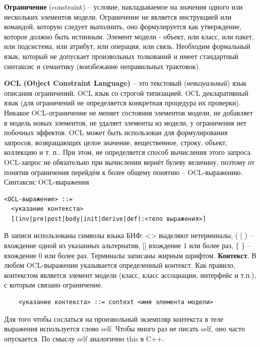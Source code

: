
\textbf{Ограничение} (constraint) – условие, накладываемое на значения одного или нескольких
элементов модели. Ограничение не является инструкцией или командой, которую следует выполнить,
оно формулируется как утверждение, которое должно быть истинным. Элемент модели - объект, или класс, или пакет, или подсистема, или атрибут, или операция, или связь.
Необходим формальный язык, который не допускает произвольных толкований и имеет стандартный синтаксис и семантику (воизбежание неправильных трактовок). 

\textbf{OCL (Object Constraint Language)} – это текстовый (\textit{невизуальный}) язык описания ограничений. OCL язык со строгой типизацией. OCL декларативный язык (для ограничений не определяется конкретная процедура их проверки). Никакое OCL-ограничение не меняет состояния элементов модели, не добавляет в модель новых элементов, не удаляет элементы из модели, у ограничения нет побочных эффектов. OCL может быть использован для формулирования запросов, возвращающих целое значение, вещественное, строку, объект, коллекцию и т. п.. При этом, не определяется способ вычисления этого запроса. OCL-запрос не обязательно при вычислении вернёт булеву величину, поэтому от понятия ограничения перейдём к более общему понятию – OCL-выражению.
Синтаксис OCL-выражения
\begin{verbatim}
<OCL-выражение> ::=
  <указание контекста>
  [(inv|pre|post|body|init|derive|def):<тело выражения>]
\end{verbatim}

В записи использованы символы языка БНФ: <> выделяют нетерминалы, ( | ) –вхождение одной из указанных альтернатив, [] вхождение 1 или более раз, \{ \} – вхождение 0 или более раз. Терминалы записаны жирным шрифтом.
\textbf{Контекст}. В любом OCL-выражении указывается определенный контекст. Как правило,
контекстом является элемент модели (класс, класс ассоциации, интерфейс и т.п.), с которым связано
ограничение.
\begin{verbatim}
    <указание контекста> ::= context <имя элемента модели>
\end{verbatim}

Для того чтобы сослаться на произвольный экземпляр контекста в теле выражения используется
слово self. Чтобы много раз не писать self, оно часто опускается. По смыслу self аналогично this в C++.

